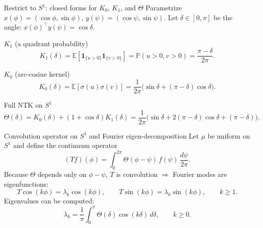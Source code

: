 \documentclass[10pt,aspectratio=169]{beamer}
\newcommand{\E}{\mathbb{E}}
\begin{document}
\begin{frame}{Restrict to $S^1$: closed forms for $K_0$, $K_1$, and $\Theta$}
	\small
	Parametrize $x(\phi)=(\cos\phi,\sin\phi)$, $y(\psi)=(\cos\psi,\sin\psi)$.
	Let $\delta\in[0,\pi]$ be the angle: $x(\phi)^\top y(\psi)=\cos\delta$.

	\begin{block}{$K_1$ (a quadrant probability)}
		\[
			K_1(\delta)=\E[\mathbf 1_{\{u>0\}}\mathbf 1_{\{v>0\}}]=\mathbb P(u>0,v>0)=\frac{\pi-\delta}{2\pi}.
		\]
	\end{block}

	\begin{block}{$K_0$ (arc-cosine kernel)}
		\[
			K_0(\delta)=\E[\sigma(u)\sigma(v)]=\frac{1}{2\pi}\Big(\sin\delta+(\pi-\delta)\cos\delta\Big).
		\]
	\end{block}

	\begin{block}{Full NTK on $S^1$}
		\[
			\boxed{
				\Theta(\delta)=K_0(\delta)+(1+\cos\delta)K_1(\delta)
				=\frac{1}{2\pi}\Big(\sin\delta+2(\pi-\delta)\cos\delta+(\pi-\delta)\Big).
			}
		\]
	\end{block}

\end{frame}

\begin{frame}{Convolution operator on $S^1$ and Fourier eigen-decomposition}
	\small
	Let $\mu$ be uniform on $S^1$ and define the continuum operator
	\[
		(Tf)(\phi)=\int_0^{2\pi}\Theta(\phi-\psi)\,f(\psi)\,\frac{d\psi}{2\pi}.
	\]
	Because $\Theta$ depends only on $\phi-\psi$, $T$ is convolution $\Rightarrow$ Fourier modes are eigenfunctions:
	\[
		T\cos(k\phi)=\lambda_k\cos(k\phi),\qquad T\sin(k\phi)=\lambda_k\sin(k\phi),\qquad k\ge 1.
	\]
	Eigenvalues can be computed:
	\[
		\boxed{
			\lambda_k=\frac{1}{\pi}\int_0^\pi \Theta(\delta)\cos(k\delta)\,d\delta,\qquad k\ge 0.
		}
	\]
\end{frame}
\end{document}
